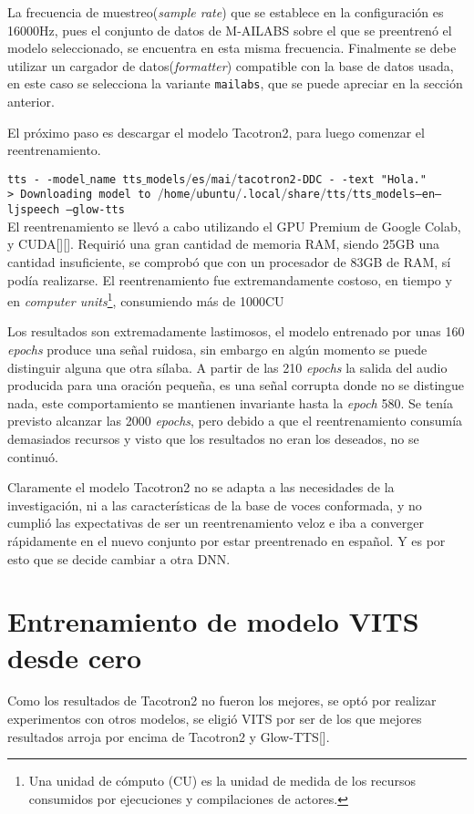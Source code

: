 La frecuencia de muestreo(\textit{sample rate}) que se establece en la configuración es 16000Hz, pues el conjunto de datos de M-AILABS sobre el que se preentrenó el modelo seleccionado, se encuentra en esta misma frecuencia. Finalmente se debe utilizar un cargador de datos(\textit{formatter}) compatible con la base de datos usada, en este caso se selecciona la variante \texttt{mailabs}, que se puede apreciar en la sección anterior.

El próximo paso es descargar el modelo Tacotron2, para luego comenzar el reentrenamiento.

\texttt{tts - -model$\_$name tts$\_$models$/$es$/$mai$/$tacotron2-DDC - -text "Hola."}\\

\texttt{> Downloading model to $/$home$/$ubuntu$/$.local$/$share$/$tts$/$tts$\_$models--en--ljspeech
	--glow-tts}\\

El reentrenamiento se llevó a cabo utilizando el GPU Premium de Google Colab, y CUDA[\cite{cuda}][\cite{cuda1}]. Requirió una gran cantidad de memoria RAM, siendo 25GB una cantidad insuficiente, se comprobó que con un procesador de 83GB de RAM, sí podía realizarse. El reentrenamiento fue extremandamente costoso, en tiempo y en \textit{computer units}\footnote{Una unidad de cómputo (CU) es la unidad de medida de los recursos consumidos por ejecuciones y compilaciones de actores.}, consumiendo más de 1000CU

Los resultados son extremadamente lastimosos, el modelo entrenado por unas 160 \textit{epochs} produce una señal ruidosa, sin embargo en algún momento se puede distinguir alguna que otra sílaba. A partir de las 210 \textit{epochs} la salida del audio producida para una oración pequeña, es una señal corrupta donde no se distingue nada, este comportamiento se mantienen invariante hasta la \textit{epoch} 580. Se tenía previsto alcanzar las 2000 \textit{epochs}, pero debido a que el reentrenamiento consumía demasiados recursos y visto que los resultados no eran los deseados, no se continuó. 

Claramente el modelo Tacotron2 no se adapta a las necesidades de la investigación, ni a las características de la base de voces conformada, y no cumplió las expectativas de ser un reentrenamiento veloz e iba a converger rápidamente en el nuevo conjunto por estar preentrenado en español. Y es por esto que se decide cambiar a otra DNN.


\section{Entrenamiento de modelo VITS desde cero} \label{vits_s}
Como los resultados de Tacotron2 no fueron los mejores, se optó por realizar experimentos con otros modelos, se eligió VITS por ser de los que mejores resultados arroja por encima de Tacotron2 y Glow-TTS[\cite{kim2021conditional}].

